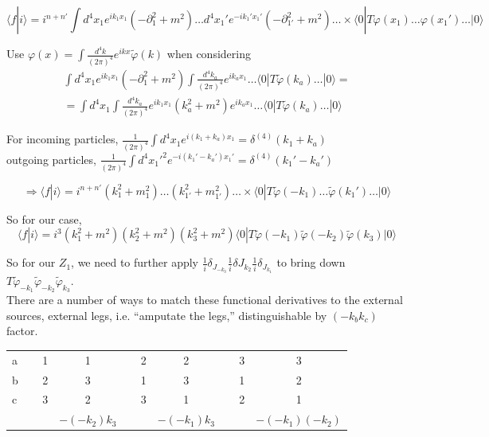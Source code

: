 \documentclass[twoside]{amsart}
\begin{document}
\[
\langle f | i \rangle = i^{n + n' } \int d^4x_1 e^{ik_1 x_1} ( - \partial_1^2 + m^2 ) \dots d^4x_1' e^{-ik_1' x_1'} ( - \partial_{1'}^2 + m^2 ) \dots \times \langle 0 | T \varphi(x_1) \dots \varphi(x_1') \dots | 0 \rangle 
\]

Use $\varphi(x) = \int \frac{ d^4k}{(2\pi)^4} e^{ikx} \widetilde{\varphi}(k)$ when considering
\[
\begin{gathered}
  \int d^4x_1 e^{ik_1 x_1} ( - \partial_1^2 + m^2 ) \int \frac{d^4k_a}{(2\pi)^4} e^{i k_a x_1} \dots \langle 0 | T \widetilde{\varphi}(k_a) \dots | 0 \rangle = \\
   = \int d^4x_1 \int \frac{d^4k_a}{(2\pi)^4} e^{ik_1 x_1} ( k_a^2 + m^2 ) e^{ik_a x_1} \dots \langle 0 | T\widetilde{\varphi}(k_a) \dots | 0 \rangle
\end{gathered}
\] 

\noindent For incoming particles, $ \frac{1}{ (2\pi)^4} \int d^4x_1 e^{ i (k_1 + k_a) x_1} = \delta^{(4)}(k_1 + k_a)$ \\ 
\phantom{For } outgoing particles, $ \frac{1}{ (2\pi)^4} \int d^4x_1'^2 e^{ -i (k_1' - k_a')x_1' } = \delta^{(4)}(k_1' - k_a')$

\[
\Longrightarrow \boxed{ \langle f | i \rangle = i^{n+n'} (k_1^2 + m_1^2) \dots (k_{1'}^2 + m_{1'}^2 ) \dots \times \langle 0 | T \widetilde{\varphi}(-k_1) \dots \widetilde{\varphi}(k_1') \dots | 0 \rangle }
\]

\hrulefill

So for our case,
\[
\langle f | i \rangle = i^3 ( k_1^2 + m^2)(k_2^2 + m^2)(k_3^2 + m^2) \langle 0 | T \widetilde{\varphi}(-k_1) \widetilde{\varphi}(-k_2) \widetilde{\varphi}(k_3) | 0 \rangle
\]

So for our $Z_1$, we need to further apply $\frac{1}{i} \delta_{J_{-k_3} } \frac{1}{i} \delta{J_{k_2} } \frac{1}{i} \delta_{J_{k_1} }$ to bring down $T \widetilde{\varphi}_{-k_1} \widetilde{\varphi}_{-k_2} \widetilde{\varphi}_{k_3}$.  \\
There are a number of ways to match these functional derivatives to the external sources, external legs, i.e. ``amputate the legs,'' distinguishable by $(-k_bk_c)$ factor.   \\

\begin{tabular}{ l r c c r c c r c c }
  a & \, & 1 & 1 & \, & 2 & 2 & \, & 3 & 3  \\ 
  b & \, & 2 & 3 & \, & 1 & 3 & \, & 1 & 2  \\ 
  c & \, & 3 & 2 & \, & 3 & 1 & \, & 2 & 1    \\
  & & & $-(-k_2)k_3$  & & & $-(-k_1)k_3$  & & & $-(-k_1)(-k_2)$ 
\end{tabular} \\
\end{document}
